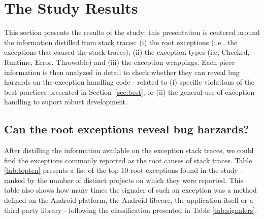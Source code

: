 \section{The Study Results}
\label{sec:result}


This section presents the results of the study; this presentation is centered around 
the information distilled from stack traces: (i) the root exceptions (i.e., the exceptions that caused the stack traces);
 (ii) the exception types (i.e, Checked, Runtime, Error, Throwable) and (iii) the exception wrappings. 
Each piece information is then analyzed in detail to 
check whether they can reveal bug harzards on the exception handling code -
related to (i) specific violations of the best practices presented in Section~\ref{sec:best},
or (ii) the general use of exception handling to suport robust development.

\subsection{Can the root exceptions reveal bug harzards?}
After distilling the information available on the exception stack traces, we could find 
the exceptions commonly reported as the root causes of stack traces.
Table \ref{tab:topten} presents a list of the top 10 root exceptions found in the study - 
 ranked by the number of distinct projects on which they were reported. 
This table also shows how many times the signaler of such an exception was a method defined on
the Android platform, the Android libcore, the application itself or a third-party library -
 following the classification presented in Table  \ref{tab:signalers}. 


